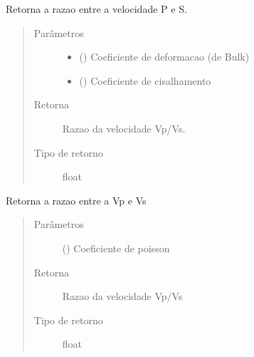 \documentclass[letterpaper,10pt,brazil]{sphinxmanual}
\begin{document}
\begin{fulllineitems}
\label{\detokenize{source/base:base.velocity_ratio_by_deformation}}
Retorna a razao entre a velocidade P e S.
\begin{quote}\begin{description}
\item[{Parâmetros}] \leavevmode\begin{itemize}
\item {} 
 () \textendash{} Coeficiente de deformacao (de Bulk)

\item {} 
 () \textendash{} Coeficiente de cisalhamento

\end{itemize}

\item[{Retorna}] \leavevmode
Razao da velocidade Vp/Vs.

\item[{Tipo de retorno}] \leavevmode
float

\end{description}\end{quote}

\end{fulllineitems}


\begin{fulllineitems}
\label{\detokenize{source/base:base.velocity_ratio_by_poisson}}
Retorna a razao entre a Vp e Vs
\begin{quote}\begin{description}
\item[{Parâmetros}] \leavevmode
{} () \textendash{} Coeficiente de poisson

\item[{Retorna}] \leavevmode
Razao da velocidade Vp/Vs

\item[{Tipo de retorno}] \leavevmode
float

\end{description}\end{quote}

\end{fulllineitems}
\end{document}
